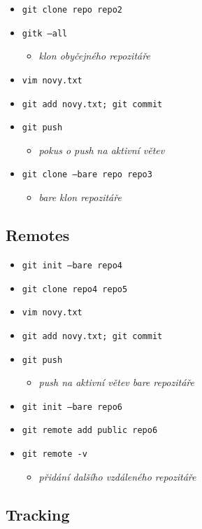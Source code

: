 \documentclass[10pt,twocolumn]{article}
\begin{document}
\begin{itemize}
	\item \texttt{git clone repo repo2}
	\item \texttt{gitk --all}
	\begin{itemize} \item \textit{klon obyčejného repozitáře} \end{itemize}
	\item \texttt{vim novy.txt}
	\item \texttt{git add novy.txt; git commit}
	\item \texttt{git push}
	\begin{itemize} \item \textit{pokus o push na aktivní větev} \end{itemize}
	\item \texttt{git clone --bare repo repo3}
	\begin{itemize} \item \textit{bare klon repozitáře} \end{itemize}
\end{itemize}

\subsection{Remotes}

\begin{itemize}
	\item \texttt{git init --bare repo4}
	\item \texttt{git clone repo4 repo5}
	\item \texttt{vim novy.txt}
	\item \texttt{git add novy.txt; git commit}
	\item \texttt{git push}
	\begin{itemize} \item \textit{push na aktivní větev bare repozitáře} \end{itemize}
	\item \texttt{git init --bare repo6}
	\item \texttt{git remote add public repo6}
	\item \texttt{git remote -v}
	\begin{itemize} \item \textit{přidání dalšího vzdáleného repozitáře} \end{itemize}
\end{itemize}

\subsection{Tracking}
\end{document}

